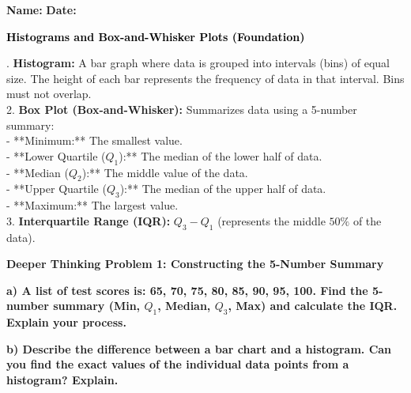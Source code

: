 \documentclass[12pt, letterpaper, fleqn]{article}
\begin{document}
\textbf{Name:} \underline{\hspace{5cm}}
\hfill
\textbf{Date:} \underline{\hspace{3cm}}\\

\begin{tcolorbox}[colback=customteal!20]
    \large\textcolor{black}{\textbf{Histograms and Box-and-Whisker Plots (Foundation)}}
\end{tcolorbox}

\vspace{3mm}

. \textbf{Histogram:} A bar graph where data is grouped into intervals (bins) of equal size. The height of each bar represents the frequency of data in that interval. Bins must not overlap. \\
2. \textbf{Box Plot (Box-and-Whisker):} Summarizes data using a 5-number summary: \\
- **Minimum:** The smallest value. \\
- **Lower Quartile ($Q_1$):** The median of the lower half of data. \\
- **Median ($Q_2$):** The middle value of the data. \\
- **Upper Quartile ($Q_3$):** The median of the upper half of data. \\
- **Maximum:** The largest value. \\
3. \textbf{Interquartile Range (IQR):} $Q_3 - Q_1$ (represents the middle $50\%$ of the data).

\vspace{4mm}

\begin{tcolorbox}[colback=yellow!15, colframe=orange, boxrule=1.5pt, arc=4mm, left=6mm, right=6mm, top=5mm, bottom=5mm]
\textbf{Deeper Thinking Problem 1: Constructing the 5-Number Summary}

\medskip

\noindent
\textbf{a) A list of test scores is: 65, 70, 75, 80, 85, 90, 95, 100. Find the 5-number summary (Min, $Q_1$, Median, $Q_3$, Max) and calculate the IQR. Explain your process.}

\vspace{2cm}

\noindent
\textbf{b) Describe the difference between a bar chart and a histogram. Can you find the exact values of the individual data points from a histogram? Explain.}

\vspace{2cm}
\end{tcolorbox}
\newpage
\end{document}

